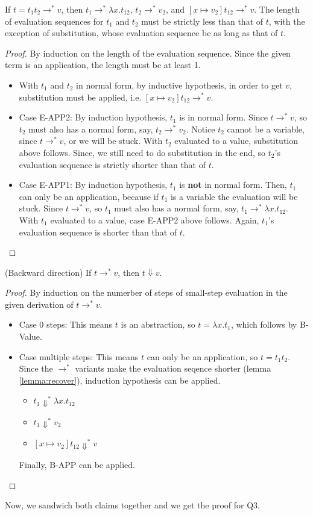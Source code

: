 \documentclass[12pt]{article}
\begin{document}
\begin{lemma}
\label{lemma:recover}
If $t = t_1t_2 \rightarrow^* v$, then $t_1 \rightarrow^* \lambda x . t_{12}$, $t_2 \rightarrow^* v_2$, and $[x \mapsto v_2] t_{12} \rightarrow^* v$.
The length of evaluation sequences for $t_1$ and $t_2$ must be strictly less than that of $t$, with the exception of substitution, whose evaluation sequence be as long as that of $t$.
\end{lemma}
\begin{proof}
By induction on the length of the evaluation sequence.
Since the given term is an application, the length must be at least 1.
\begin{itemize}
\item
With $t_1$ and $t_2$ in normal form, by inductive hypothesis, in order to get $v$, substitution must be applied, i.e. $[x \mapsto v_2] t_{12} \rightarrow^* v$.
\item
Case E-APP2:
By induction hypothesis, $t_1$ is in normal form.
Since $t \rightarrow^* v$, so $t_2$ must also has a normal form, say, $t_2 \rightarrow^* v_2$.
Notice $t_2$ cannot be a variable, since $t \rightarrow^* v$, or we will be stuck.
With $t_2$ evaluated to a value, substitution above follows.
Since, we still need to do substitution in the end, so $t_2$'s evaluation sequence is strictly shorter than that of $t$.
\item
Case E-APP1:
By induction hypothesis, $t_1$ is {\bf not} in normal form.
Then, $t_1$ can only be an application, because if $t_1$ is a variable the evaluation will be stuck.
Since $t \rightarrow^* v$, so $t_1$ must also has a normal form, say, $t_1 \rightarrow^* \lambda x.t_{12}$.
With $t_1$ evaluated to a value, case E-APP2 above follows.
Again, $t_1$'s evaluation sequence is shorter than that of $t$.
\end{itemize}
\end{proof}

\begin{claim}
(Backward direction) If $t \rightarrow^* v$, then $t \Downarrow v$.
\end{claim}
\begin{proof}
By induction on the numerber of steps of small-step evaluation in the given derivation of $t \rightarrow^* v$.
\begin{itemize}
\item
Case 0 steps:
This means $t$ is an abstraction, so $t = \lambda x . t_1$, which follows by B-Value.
\item
Case multiple steps:
This means $t$ can only be an application, so $t = t_1t_2$.
Since the $\rightarrow^*$ variants make the evaluation seqence shorter (lemma \ref{lemma:recover}), induction hypothesis can be applied.
\begin{itemize}
\item
$t_1 \Downarrow^* \lambda x . t_{12}$
\item
$t_1 \Downarrow^* v_2$
\item
$[x \mapsto v_2] t_{12} \Downarrow^* v$
\end{itemize}
Finally, B-APP can be applied.
\end{itemize}
\end{proof}
Now, we sandwich both claims together and we get the proof for Q3.
\done
\end{document}
